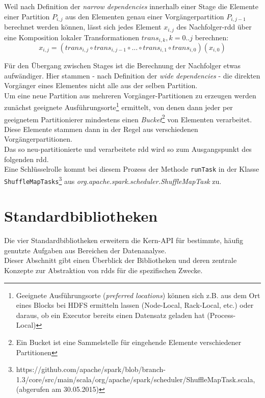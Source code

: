 Weil nach Definition der \textit{narrow dependencies} innerhalb einer Stage die Elemente einer Partition \(P_{i,j}\) aus den Elementen genau einer Vorgängerpartition \(P_{i,j-1}\) berechnet werden können, lässt sich jedes Element \(x_{i,j}\) des Nachfolger-\gls{rdd} über eine Komposition lokaler Transformationen \(trans_{i,k}, k = 0..j\) berechnen:\\ 

\[x_{i,j} = (trans_{i,j} \circ trans_{i,j-1} \circ ... \circ trans_{i,1}\circ trans_{i,0})(x_{i,0})\]

Für den Übergang zwischen Stages ist die Berechnung der Nachfolger etwas aufwändiger. Hier stammen - nach Definition der \textit{wide dependencies} - die direkten Vorgänger eines Elementes nicht alle aus der selben Partition.\\

Um eine neue Partition aus mehreren Vorgänger-Partitionen zu erzeugen werden zunächst geeignete Ausführungsorte\footnote{Geeignete Ausführungsorte (\textit{preferred locations}) können sich z.B. aus dem Ort eines Blocks bei HDFS ermitteln lassen (Node-Local, Rack-Local, etc.) oder daraus, ob ein Executor bereits einen Datensatz geladen hat (Process-Local)} ermittelt, von denen dann jeder per geeignetem Partitionierer mindestens einen \textit{Bucket}\footnote{Ein Bucket ist eine Sammelstelle für eingehende Elemente verschiedener Partitionen} von Elementen verarbeitet. Diese Elemente stammen dann in der Regel aus verschiedenen Vorgängerpartitionen.\\
Das so neu-partitionierte und verarbeitete \gls{rdd} wird so zum Ausgangspunkt des folgenden \gls{rdd}.\\
Eine Schlüsselrolle kommt bei diesem Prozess der Methode \lstinline|runTask| in der Klasse \lstinline|ShuffleMapTasks|\footnote{https://github.com/apache/spark/blob/branch-1.3/core/src/main/scala/org/apache/spark/scheduler/ShuffleMapTask.scala, (abgerufen am 30.05.2015)} aus \textit{org.apache.spark.scheduler.ShuffleMapTask} zu.\\

\section{Standardbibliotheken}
Die vier Standardbibliotheken erweitern die Kern-API für bestimmte, häufig genutzte Aufgaben aus Bereichen der Datenanalyse.\\

Dieser Abschnitt gibt einen Überblick der Bibliotheken und deren zentrale Konzepte zur Abstraktion von \glspl{rdd} für die spezifischen Zwecke.\\

